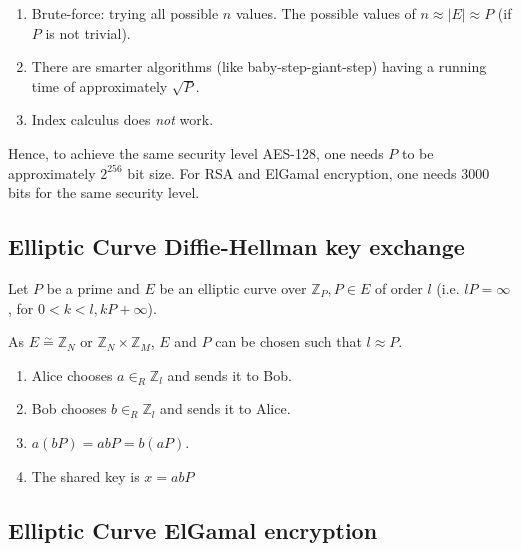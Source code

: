 \documentclass[11pt]{article}
\theoremstyle{definition}
\theoremstyle{proof}
\begin{document}
\begin{enumerate}
	\item Brute-force: trying all possible $n$ values. The possible values of $n \approx |E| \approx P$ (if $P$ is not trivial).
	\item There are smarter algorithms (like baby-step-giant-step) having a running time of approximately $\sqrt{P}$.
	\item Index calculus does \emph{not} work.
\end{enumerate}

Hence, to achieve the same security level AES-128, one needs $P$ to be approximately $2^{256}$ bit size. For RSA and ElGamal encryption, one needs $3000$ bits for the same security level.

\subsection{Elliptic Curve Diffie-Hellman key exchange}

Let $P$ be a prime and $E$ be an elliptic curve over $\mathbb{Z}_P, P \in E$ of order $l$ (i.e. $lP = \infty$, for $0 < k < l, kP + \infty$).

As $E \stackrel{\sim}{=} \mathbb{Z}_N$ or $\mathbb{Z}_N \times \mathbb{Z}_M$, $E$ and $P$ can be chosen such that $l \approx P$.

\begin{enumerate}
	\item Alice chooses $a \in_R \mathbb{Z}_l$ and sends it to Bob.
	\item Bob chooses $b \in_R \mathbb{Z}_l$ and sends it to Alice.
	\item $a(bP) = abP = b(aP)$.
	\item The shared key is $x = abP$
\end{enumerate}

\subsection{Elliptic Curve ElGamal encryption}
\end{document}
